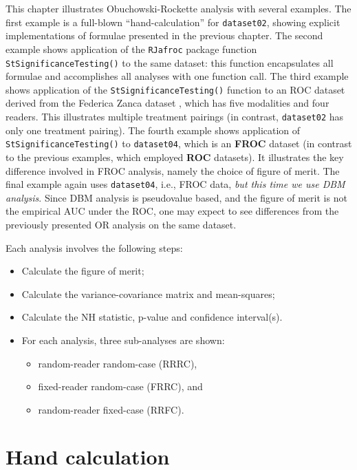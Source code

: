 \documentclass[
]{book}
\providecommand{\tightlist}{%
  \setlength{\itemsep}{0pt}\setlength{\parskip}{0pt}}
\begin{document}
This chapter illustrates Obuchowski-Rockette analysis with several examples. The first example is a full-blown ``hand-calculation'' for \texttt{dataset02}, showing explicit implementations of formulae presented in the previous chapter. The second example shows application of the \texttt{RJafroc} package function \texttt{StSignificanceTesting()} to the same dataset: this function encapsulates all formulae and accomplishes all analyses with one function call. The third example shows application of the \texttt{StSignificanceTesting()} function to an ROC dataset derived from the Federica Zanca dataset \citep{RN1882}, which has five modalities and four readers. This illustrates multiple treatment pairings (in contrast, \texttt{dataset02} has only one treatment pairing). The fourth example shows application of \texttt{StSignificanceTesting()} to \texttt{dataset04}, which is an \textbf{FROC} dataset (in contrast to the previous examples, which employed \textbf{ROC} datasets). It illustrates the key difference involved in FROC analysis, namely the choice of figure of merit. The final example again uses \texttt{dataset04}, i.e., FROC data, \emph{but this time we use DBM analysis}. Since DBM analysis is pseudovalue based, and the figure of merit is not the empirical AUC under the ROC, one may expect to see differences from the previously presented OR analysis on the same dataset.

Each analysis involves the following steps:

\begin{itemize}
\tightlist
\item
  Calculate the figure of merit;
\item
  Calculate the variance-covariance matrix and mean-squares;
\item
  Calculate the NH statistic, p-value and confidence interval(s).
\item
  For each analysis, three sub-analyses are shown:

  \begin{itemize}
  \tightlist
  \item
    random-reader random-case (RRRC),
  \item
    fixed-reader random-case (FRRC), and
  \item
    random-reader fixed-case (RRFC).
  \end{itemize}
\end{itemize}

\hypertarget{or-applications-dataset02-hand}{%
\section{Hand calculation}\label{or-applications-dataset02-hand}}
\end{document}
